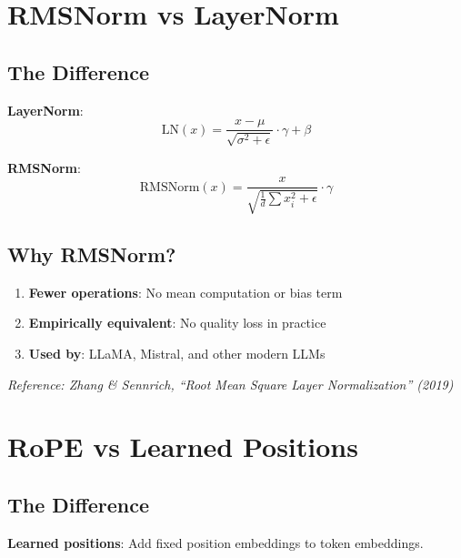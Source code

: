 \section{RMSNorm vs LayerNorm}

\subsection{The Difference}

\textbf{LayerNorm}:
\begin{equation}
\text{LN}(x) = \frac{x - \mu}{\sqrt{\sigma^2 + \epsilon}} \cdot \gamma + \beta
\end{equation}

\textbf{RMSNorm}:
\begin{equation}
\text{RMSNorm}(x) = \frac{x}{\sqrt{\frac{1}{d}\sum x_i^2 + \epsilon}} \cdot \gamma
\end{equation}

\subsection{Why RMSNorm?}

\begin{enumerate}
    \item \textbf{Fewer operations}: No mean computation or bias term
    \item \textbf{Empirically equivalent}: No quality loss in practice
    \item \textbf{Used by}: LLaMA, Mistral, and other modern LLMs
\end{enumerate}

\textit{Reference: Zhang \& Sennrich, ``Root Mean Square Layer Normalization'' (2019)}

\section{RoPE vs Learned Positions}

\subsection{The Difference}

\textbf{Learned positions}: Add fixed position embeddings to token embeddings.

